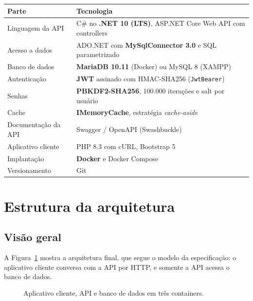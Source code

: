\documentclass[12pt,a4paper]{article}
\newcommand{\cod}[1]{\texttt{#1}}
\begin{document}
\begin{tabularx}{\textwidth}{@{}lL@{}}
\toprule
\textbf{Parte} & \textbf{Tecnologia} \\
\midrule
Linguagem da API     & C\# no \textbf{.NET 10 (LTS)}, ASP.NET Core Web API com controllers \\
Acesso a dados       & ADO.NET com \textbf{MySqlConnector 3.0} e SQL parametrizado \\
Banco de dados       & \textbf{MariaDB 10.11} (Docker) ou MySQL 8 (XAMPP) \\
Autenticação         & \textbf{JWT} assinado com HMAC-SHA256 (\cod{JwtBearer}) \\
Senhas               & \textbf{PBKDF2-SHA256}, 100.000 iterações e salt por usuário \\
Cache                & \textbf{IMemoryCache}, estratégia \textit{cache-aside} \\
Documentação da API  & Swagger / OpenAPI (Swashbuckle) \\
Aplicativo cliente   & PHP 8.3 com cURL, Bootstrap 5 \\
Implantação          & \textbf{Docker} e Docker Compose \\
Versionamento        & Git \\
\bottomrule
\end{tabularx}

\section{Estrutura da arquitetura}

\subsection{Visão geral}

A Figura~\ref{fig:geral} mostra a arquitetura final, que segue o modelo da especificação: o
aplicativo cliente conversa com a API por HTTP, e somente a API acessa o banco de dados.

\begin{figure}[h]
\centering
{}
\caption{Aplicativo cliente, API e banco de dados em três containers.}
\label{fig:geral}
\end{figure}
\end{document}

